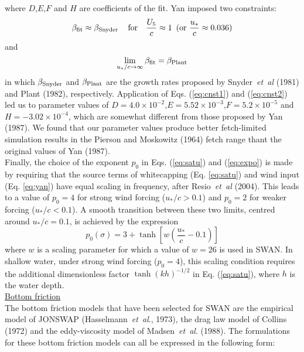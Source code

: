 \documentclass[12pt]{book}
\begin{document}
where $D$,$E$,$F$ and $H$ are coefficients of the fit. Yan imposed two constraints:
\begin{equation}
  \beta_{\rm fit} \approx \beta_{\rm Snyder}\, \quad \mbox{for} \quad \frac{U_5}{c} \approx 1\,\,\, (\mbox{or} \,\, \frac{u_*}{c} \approx 0.036)
  \label{eq:cnst1}
\end{equation}
and
\begin{equation}
  \lim \limits_{u_*/c \rightarrow \infty} \beta_{\rm fit} = \beta_{\rm Plant}
  \label{eq:cnst2}
\end{equation}
in which $\beta_{\rm Snyder}$ and $\beta_{\rm Plant}$ are the growth rates proposed by Snyder~{\it et~al} (1981) and Plant (1982), respectively.
Application of Eqs. (\ref{eq:cnst1}) and (\ref{eq:cnst2}) led us to parameter values of $D=4.0 \times 10^{-2}$,$E=5.52 \times 10^{-3}$,$F=5.2 \times 10^{-5}$
and $H=-3.02 \times 10^{-4}$, which are somewhat different from those proposed by Yan (1987). We found that our parameter values produce better
fetch-limited simulation results in the Pierson and Moskowitz (1964) fetch range thant the original values of Yan (1987).
\\[2ex]
\noindent
Finally, the choice of the exponent $p_0$ in Eqs. (\ref{eq:satu}) and (\ref{eq:expo}) is made by requiring that the source terms of whitecapping
(Eq. \ref{eq:satu}) and wind input (Eq. \ref{eq:yan}) have equal scaling in frequency, after Resio~{\it et~al} (2004). This leads to a value of
$p_0 = 4$ for strong wind forcing ($u_*/c > 0.1$) and $p_0 = 2$ for weaker forcing ($u_*/c < 0.1$). A smooth transition between these two limits,
centred around $u_*/c = 0.1$, is achieved by the expression
\begin{equation}
  p_0(\sigma) = 3 + \tanh \left[ w \left( \frac{u_*}{c} - 0.1 \right) \right]
\end{equation}
where $w$ is a scaling parameter for which a value of $w = 26$ is used in SWAN. In shallow water, under strong wind forcing ($p_0=4$), this
scaling condition requires the additional dimensionless factor ${\tanh(kh)}^{-1/2}$ in Eq. (\ref{eq:satu}), where $h$ is the water depth.
\nocite{Res04LV}
\\[2ex]
\noindent
\underline{Bottom friction}\\[2ex]
The bottom friction models that have been selected for SWAN are the empirical model of JONSWAP
(Hasselmann~{\it et~al}., 1973), the drag law model of Collins (1972) and the eddy-viscosity model of
Madsen~{\it et~al}. (1988). The formulations for these bottom friction models can all be expressed in the following form:
\end{document}
